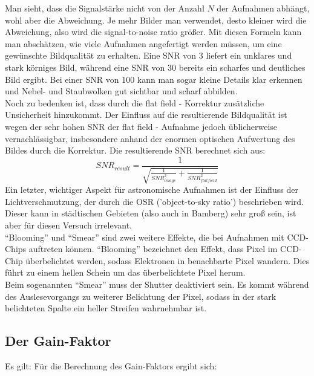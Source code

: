 Man sieht, dass die Signalstärke nicht von der Anzahl $N$ der Aufnahmen abhängt, wohl aber die Abweichung. Je mehr Bilder man verwendet, desto kleiner wird die Abweichung, also wird die signal-to-noise ratio größer. Mit diesen Formeln kann man abschätzen, wie viele Aufnahmen angefertigt werden müssen, um eine gewünschte Bildqualität zu erhalten. Eine SNR von 3 liefert ein unklares und stark körniges Bild, während eine SNR von 30 bereits ein scharfes und deutliches Bild ergibt. Bei einer SNR von 100 kann man sogar kleine Details klar erkennen und Nebel- und Staubwolken gut sichtbar und scharf abbilden.
\\
Noch zu bedenken ist, dass durch die flat field - Korrektur zusätzliche Unsicherheit hinzukommt. Der Einfluss auf die resultierende Bildqualität ist wegen der sehr hohen SNR der flat field - Aufnahme jedoch üblicherweise vernachlässigbar, insbesondere anhand der enormen optischen Aufwertung des Bildes durch die Korrektur. Die resultierende SNR berechnet sich aus:
\begin{equation}
SNR_{result} = \frac{1}{\sqrt{\frac{1}{SNR_{image}^2} + \frac{1}{SNR_{flatfield}^2}}}
\end{equation}
Ein letzter, wichtiger Aspekt für astronomische Aufnahmen ist der Einfluss der Lichtverschmutzung, der durch die OSR ('object-to-sky ratio') beschrieben wird. Dieser kann in städtischen Gebieten (also auch in Bamberg) sehr groß sein, ist aber für diesen Versuch irrelevant.\\
\enquote{Blooming} und \enquote{Smear} sind zwei weitere Effekte, die bei Aufnahmen mit CCD-Chips auftreten können. 
\enquote{Blooming} bezeichnet den Effekt, dass Pixel im CCD-Chip überbelichtet werden, sodass Elektronen in benachbarte Pixel wandern. Dies führt zu einem hellen Schein um das überbelichtete Pixel herum. \\
Beim sogenannten \enquote{Smear} muss der Shutter deaktiviert sein. Es kommt während des Auslesevorgangs zu weiterer Belichtung der Pixel, sodass in der stark belichteten Spalte ein heller Streifen wahrnehmbar ist. 


\subsection{Der Gain-Faktor}Es gilt: 
Für die Berechnung des Gain-Faktors ergibt sich: \

